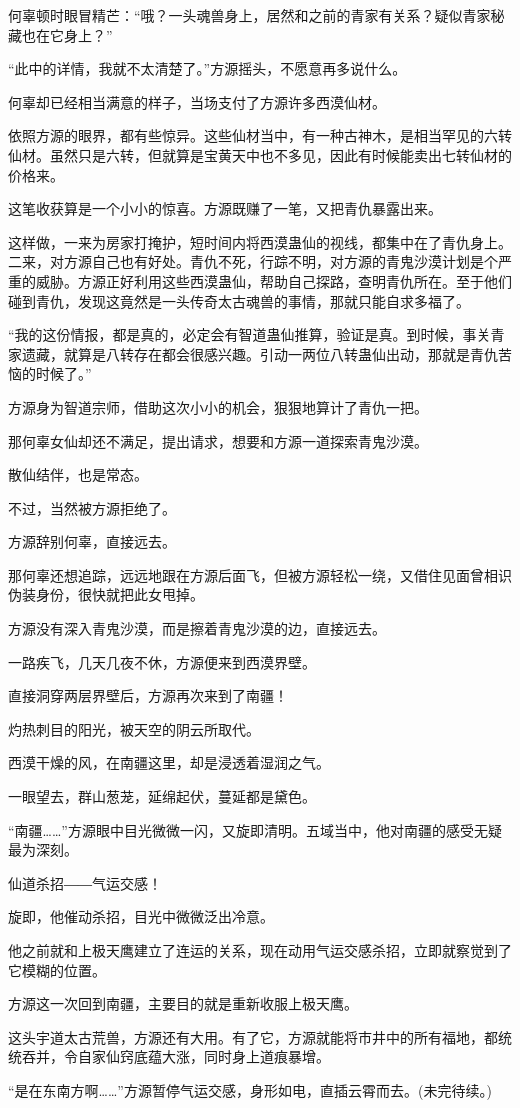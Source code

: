 \begin{this_body}
何辜顿时眼冒精芒：“哦？一头魂兽身上，居然和之前的青家有关系？疑似青家秘藏也在它身上？”

“此中的详情，我就不太清楚了。”方源摇头，不愿意再多说什么。

何辜却已经相当满意的样子，当场支付了方源许多西漠仙材。

依照方源的眼界，都有些惊异。这些仙材当中，有一种古神木，是相当罕见的六转仙材。虽然只是六转，但就算是宝黄天中也不多见，因此有时候能卖出七转仙材的价格来。

这笔收获算是一个小小的惊喜。方源既赚了一笔，又把青仇暴露出来。

这样做，一来为房家打掩护，短时间内将西漠蛊仙的视线，都集中在了青仇身上。二来，对方源自己也有好处。青仇不死，行踪不明，对方源的青鬼沙漠计划是个严重的威胁。方源正好利用这些西漠蛊仙，帮助自己探路，查明青仇所在。至于他们碰到青仇，发现这竟然是一头传奇太古魂兽的事情，那就只能自求多福了。

“我的这份情报，都是真的，必定会有智道蛊仙推算，验证是真。到时候，事关青家遗藏，就算是八转存在都会很感兴趣。引动一两位八转蛊仙出动，那就是青仇苦恼的时候了。”

方源身为智道宗师，借助这次小小的机会，狠狠地算计了青仇一把。

那何辜女仙却还不满足，提出请求，想要和方源一道探索青鬼沙漠。

散仙结伴，也是常态。

不过，当然被方源拒绝了。

方源辞别何辜，直接远去。

那何辜还想追踪，远远地跟在方源后面飞，但被方源轻松一绕，又借住见面曾相识伪装身份，很快就把此女甩掉。

方源没有深入青鬼沙漠，而是擦着青鬼沙漠的边，直接远去。

一路疾飞，几天几夜不休，方源便来到西漠界壁。

直接洞穿两层界壁后，方源再次来到了南疆！

灼热刺目的阳光，被天空的阴云所取代。

西漠干燥的风，在南疆这里，却是浸透着湿润之气。

一眼望去，群山葱茏，延绵起伏，蔓延都是黛色。

“南疆……”方源眼中目光微微一闪，又旋即清明。五域当中，他对南疆的感受无疑最为深刻。

仙道杀招――气运交感！

旋即，他催动杀招，目光中微微泛出冷意。

他之前就和上极天鹰建立了连运的关系，现在动用气运交感杀招，立即就察觉到了它模糊的位置。

方源这一次回到南疆，主要目的就是重新收服上极天鹰。

这头宇道太古荒兽，方源还有大用。有了它，方源就能将市井中的所有福地，都统统吞并，令自家仙窍底蕴大涨，同时身上道痕暴增。

“是在东南方啊……”方源暂停气运交感，身形如电，直插云霄而去。(未完待续。)

\end{this_body}

